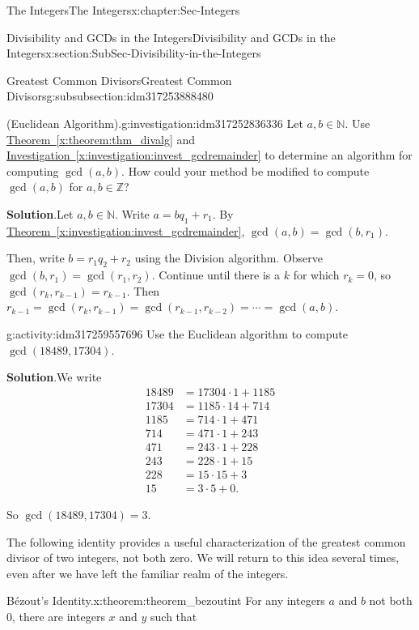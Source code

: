 \documentclass[oneside,10pt,]{book}
\newcommand{\blocktitlefont}{\relax}
\newcommand{\xreffont}{\relax}
\numberwithin{equation}{section}
\def\Z{{\mathbb Z}}
\def\N{{\mathbb N}}
\newcommand{\amp}{&}
\begin{document}
\begin{chapterptx}{The Integers}{}{The Integers}{}{}{x:chapter:Sec-Integers}
\begin{sectionptx}{Divisibility and GCDs in the Integers}{}{Divisibility and GCDs in the Integers}{}{}{x:section:SubSec-Divisibility-in-the-Integers}
\begin{subsubsectionptx}{Greatest Common Divisors}{}{Greatest Common Divisors}{}{}{g:subsubsection:idm317253888480}
\begin{investigation}{(Euclidean Algorithm).}{g:investigation:idm317252836336}
Let \(a,b\in \N\). Use \hyperref[x:theorem:thm_divalg]{Theorem~{\xreffont\ref{x:theorem:thm_divalg}}} and \hyperref[x:investigation:invest_gcdremainder]{Investigation~{\xreffont\ref{x:investigation:invest_gcdremainder}}} to determine an algorithm for computing \(\gcd(a,b)\). How could your method be modified to compute \(\gcd(a,b)\) for \(a,b\in\Z\)?%
\par\smallskip%
\noindent\textbf{\blocktitlefont Solution}.\hypertarget{g:solution:idm317253737152}{}\quad{}Let \(a,b\in \N\). Write \(a = bq_1+r_1\). By \hyperref[x:investigation:invest_gcdremainder]{Theorem~{\xreffont\ref{x:investigation:invest_gcdremainder}}}, \(\gcd(a,b) = \gcd(b,r_1)\).%
\par
Then, write \(b = r_1 q_2 + r_2\) using the Division algorithm. Observe \(\gcd(b,r_1) = \gcd(r_1,r_2)\). Continue until there is a \(k\) for which \(r_k = 0\), so \(\gcd(r_k,r_{k-1}) = r_{k-1}\). Then \(r_{k-1}= \gcd(r_k, r_{k-1}) = \gcd(r_{k-1},r_{k-2}) = \cdots = \gcd(a,b)\).%
\end{investigation}
\begin{activity}{}{g:activity:idm317259557696}%
Use the Euclidean algorithm to compute \(\gcd(18489,17304)\).%
\par\smallskip%
\noindent\textbf{\blocktitlefont Solution}.\hypertarget{g:solution:idm317259554320}{}\quad{}We write%
\begin{align*}
18489 \amp = 17304 \cdot 1 +1185\\
17304 \amp = 1185\cdot 14 +714\\
1185 \amp = 714 \cdot 1 + 471\\
714 \amp = 471 \cdot 1+ 243\\
471 \amp = 243\cdot 1 + 228\\
243 \amp = 228 \cdot 1+ 15\\
228 \amp = 15 \cdot 15 + 3\\
15 \amp = 3\cdot 5 + 0\text{.}
\end{align*}
%
\par
So \(\gcd(18489,17304)=3\).%
\end{activity}
The following identity provides a useful characterization of the greatest common divisor of two integers, not both zero. We will return to this idea several times, even after we have left the familiar realm of the integers.%
\begin{theorem}{Bézout's Identity.}{}{x:theorem:theorem_bezoutint}%
%
For any integers \(a\) and \(b\) not both 0, there are integers \(x\) and \(y\) such that%

\end{theorem}
\end{subsubsectionptx}
\end{sectionptx}
\end{chapterptx}
\end{document}
